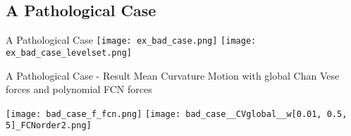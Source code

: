 \subsection{A Pathological Case}
\begin{frame}{A Pathological Case}
    \centering
\texttt{[image: ex\_bad\_case.png]}
\texttt{[image: ex\_bad\_case\_levelset.png]}
\end{frame}

\begin{frame}{A Pathological Case - Result}
    Mean Curvature Motion with global Chan Vese forces and polynomial FCN forces \\ 

    \centering
    \texttt{[image: bad\_case\_f\_fcn.png]}
    \texttt{[image: bad\_case\_\_CVglobal\_\_w[0.01, 0.5, 5]\_FCNorder2.png]}
\end{frame}
